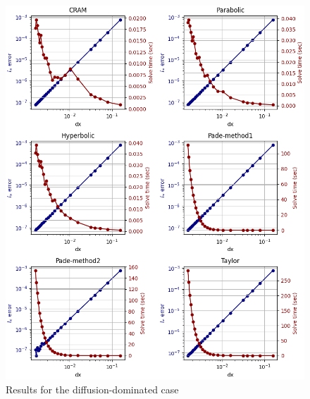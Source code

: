 \begin{figure}[p]
    \centering
    \includegraphics[width=5.0in]{images/chapter-5/diffusion_dominated.png}
    \caption{Results for the diffusion-dominated case}
    \label{fig:problem2_diffusion_dom}
\end{figure}

\clearpage

